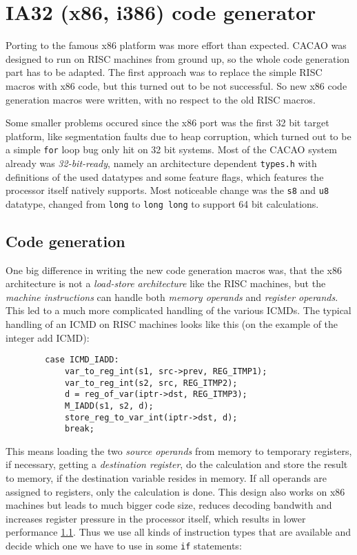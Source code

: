 \section{IA32 (x86, i386) code generator}

Porting to the famous x86 platform was more effort than
expected. CACAO was designed to run on RISC machines from ground up,
so the whole code generation part has to be adapted. The first
approach was to replace the simple RISC macros with x86 code, but this
turned out to be not successful. So new x86 code generation macros
were written, with no respect to the old RISC macros.

Some smaller problems occured since the x86 port was the first 32 bit
target platform, like segmentation faults due to heap corruption,
which turned out to be a simple \texttt{for} loop bug only hit on 32
bit systems. Most of the CACAO system already was
\textit{32-bit-ready}, namely an architecture dependent
\texttt{types.h} with definitions of the used datatypes and some
feature flags, which features the processor itself natively
supports. Most noticeable change was the \texttt{s8} and \texttt{u8}
datatype, changed from \texttt{long} to \texttt{long long} to support
64 bit calculations.


\subsection{Code generation}

One big difference in writing the new code generation macros was, that
the x86 architecture is not a \textit{load-store architecture} like
the RISC machines, but the \textit{machine instructions} can handle
both \textit{memory operands} and \textit{register operands}. This led
to a much more complicated handling of the various ICMDs. The typical
handling of an ICMD on RISC machines looks like this (on the example
of the integer add ICMD):

\begin{verbatim}
        case ICMD_IADD:
            var_to_reg_int(s1, src->prev, REG_ITMP1);
            var_to_reg_int(s2, src, REG_ITMP2);
            d = reg_of_var(iptr->dst, REG_ITMP3);
            M_IADD(s1, s2, d);
            store_reg_to_var_int(iptr->dst, d);
            break;
\end{verbatim}

This means loading the two \textit{source operands} from memory to
temporary registers, if necessary, getting a \textit{destination
register}, do the calculation and store the result to memory, if the
destination variable resides in memory. If all operands are assigned
to registers, only the calculation is done. This design also works on
x86 machines but leads to much bigger code size, reduces decoding
bandwith and increases register pressure in the processor itself,
which results in lower performance \ref{}. Thus we use all kinds of
instruction types that are available and decide which one we have to
use in some \texttt{if} statements:


